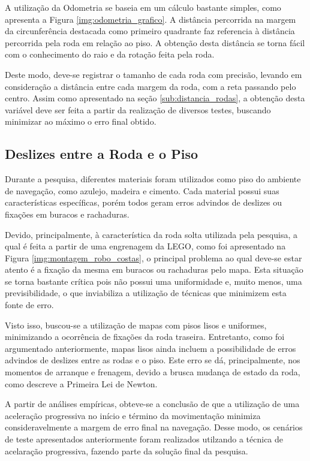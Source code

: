    A utilização da Odometria se baseia em um cálculo bastante simples, como apresenta a Figura \ref{img:odometria_grafico}. A distância percorrida
   na margem da circunferência destacada como primeiro quadrante faz referencia à distância percorrida pela roda em relação ao piso. A obtenção desta distância se torna fácil
   com o conhecimento do raio e da rotação feita pela roda.

   Deste modo, deve-se registrar o tamanho de cada roda com precisão, levando em consideração a distância entre cada margem da roda,
   com a reta passando pelo centro. Assim como apresentado na seção \ref{sub:distancia_rodas}, a obtenção desta variável deve ser feita
   a partir da realização de diversos testes, buscando minimizar ao máximo o erro final obtido.

\subsection{Deslizes entre a Roda e o Piso}
\label{sub:deslizes}

  Durante a pesquisa, diferentes materiais foram utilizados como piso do ambiente de navegação, como azulejo, madeira e cimento. Cada
  material possui suas características específicas, porém todos geram erros advindos de deslizes ou fixações em buracos e rachaduras.

  Devido, principalmente, à característica da roda solta utilizada pela pesquisa, a qual é feita a partir de uma engrenagem da
  LEGO, como foi apresentado na Figura \ref{img:montagem_robo_costas}, o principal problema ao qual deve-se estar atento é a fixação da mesma
  em buracos ou rachaduras pelo mapa. Esta situação se torna bastante crítica pois não possui uma uniformidade e, muito menos,
  uma previsibilidade, o que inviabiliza a utilização de técnicas que minimizem esta fonte de erro.

  Visto isso, buscou-se a utilização de mapas com pisos lisos e uniformes, minimizando a ocorrência de fixações da roda traseira.
  Entretanto, como foi argumentado anteriormente, mapas lisos ainda incluem a possibilidade de erros advindos de deslizes entre as
  rodas e o piso. Este erro se dá, principalmente, nos momentos de arranque e frenagem, devido a brusca mudança de estado da roda,
  como descreve a Primeira Lei de Newton.

  A partir de análises empíricas, obteve-se a conclusão de que a utilização de uma aceleração progressiva no início e término da movimentação
  minimiza consideravelmente a margem de erro final na navegação. Desse modo, os cenários de teste apresentados anteriormente foram realizados
  utilzando a técnica de acelaração progressiva, fazendo parte da solução final da pesquisa.


